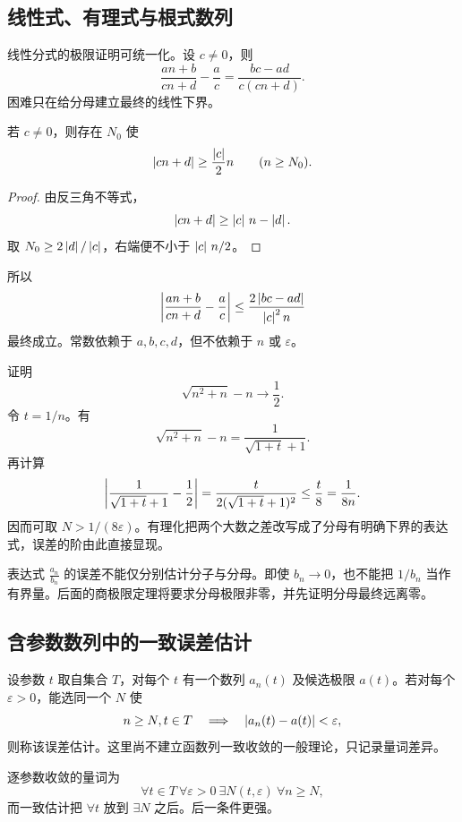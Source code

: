\subsection{线性式、有理式与根式数列}

线性分式的极限证明可统一化。设 \(c\ne0\)，则
\[
 \frac{an+b}{cn+d}-\frac ac
 =\frac{bc-ad}{c(cn+d)}.
\]
困难只在给分母建立最终的线性下界。

\begin{lemma}[分母远离零]
若 \(c\ne0\)，则存在 \(N_0\) 使
\[
 \left|cn+d\right|\ge\frac{\left|c\right|}{2}n\qquad(n\ge N_0).
\]
\end{lemma}

\begin{proof}
由反三角不等式，
\[
 \left|cn+d\right|\ge\left|c\right|\,n-\left|d\right|.
\]
取 \(N_0\ge2\left|d\right|/\left|c\right|\)，右端便不小于 \(\left|c\right|\,n/2\)。
\end{proof}

所以
\[
 \left|\frac{an+b}{cn+d}-\frac ac\right|
 \le\frac{2\left|bc-ad\right|}{\left|c\right|^2 n}
\]
最终成立。常数依赖于 \(a,b,c,d\)，但不依赖于 \(n\) 或 \(\varepsilon\)。

\begin{example}[根式的有理化]
证明
\[
 \sqrt{n^2+n}-n\longrightarrow\frac12.
\]
令 \(t=1/n\)。有
\[
 \sqrt{n^2+n}-n=\frac1{\sqrt{1+t}+1}.
\]
再计算
\[
 \left|\frac1{\sqrt{1+t}+1}-\frac12\right|
 =\frac{t}{2(\sqrt{1+t}+1)^2}\le\frac{t}{8}=\frac1{8n}.
\]
因而可取 \(N>1/(8\varepsilon)\)。有理化把两个大数之差改写成了分母有明确下界的表达式，误差的阶由此直接显现。
\end{example}

\begin{example}[分母可能接近零]
表达式
\(\frac{a_n}{b_n}\) 的误差不能仅分别估计分子与分母。即使 \(b_n\to0\)，也不能把 \(1/b_n\) 当作有界量。后面的商极限定理将要求分母极限非零，并先证明分母最终远离零。
\end{example}

\subsection{含参数数列中的一致误差估计}

设参数 \(t\) 取自集合 \(T\)，对每个 \(t\) 有一个数列 \(a_n(t)\) 及候选极限 \(a(t)\)。若对每个 \(\varepsilon>0\)，能选同一个 \(N\) 使
\[
 n\ge N, t\in T
 \quad\Longrightarrow\quad
 \left|a_n(t)-a(t)\right|<\varepsilon,
\]
则称该误差估计。这里尚不建立函数列一致收敛的一般理论，只记录量词差异。

逐参数收敛的量词为
\[
 \forall t\in T\ \forall\varepsilon>0\ \exists N(t,\varepsilon)\ \forall n\ge N,
\]
而一致估计把 \(\forall t\) 放到 \(\exists N\) 之后。后一条件更强。

